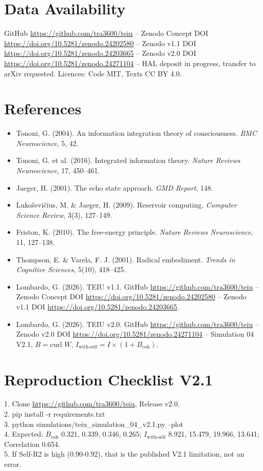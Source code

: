 \documentclass[11pt,a4paper]{article}
\begin{document}
\section*{Data Availability}
GitHub \url{https://github.com/tra3600/teiu} -- Zenodo Concept DOI \url{https://doi.org/10.5281/zenodo.24202580} -- Zenodo v1.1 DOI \url{https://doi.org/10.5281/zenodo.24203665} -- Zenodo v2.0 DOI \url{https://doi.org/10.5281/zenodo.24271104} -- HAL deposit in progress, transfer to arXiv requested. Licences: Code MIT, Texts CC BY 4.0.

\section*{References}
\begin{itemize}
\item Tononi, G. (2004). An information integration theory of consciousness. \textit{BMC Neuroscience}, 5, 42.
\item Tononi, G. et al. (2016). Integrated information theory. \textit{Nature Reviews Neuroscience}, 17, 450--461.
\item Jaeger, H. (2001). The echo state approach. \textit{GMD Report}, 148.
\item Luko\v{s}evi\v{c}ius, M. \& Jaeger, H. (2009). Reservoir computing. \textit{Computer Science Review}, 3(3), 127--149.
\item Friston, K. (2010). The free-energy principle. \textit{Nature Reviews Neuroscience}, 11, 127--138.
\item Thompson, E. \& Varela, F. J. (2001). Radical embodiment. \textit{Trends in Cognitive Sciences}, 5(10), 418--425.
\item Lombardo, G. (2026). TEIU v1.1. GitHub \url{https://github.com/tra3600/teiu} -- Zenodo Concept DOI \url{https://doi.org/10.5281/zenodo.24202580} -- Zenodo v1.1 DOI \url{https://doi.org/10.5281/zenodo.24203665}.
\item Lombardo, G. (2026). TEIU v2.0. GitHub \url{https://github.com/tra3600/teiu} -- Zenodo v2.0 DOI \url{https://doi.org/10.5281/zenodo.24271104} -- Simulation 04 V2.1, $B = \text{curl } W$, $I_{\text{with-self}} = I \times (1 + B_{\text{coh}})$.
\end{itemize}

\appendix
\section{Reproduction Checklist V2.1}
1. Clone \url{https://github.com/tra3600/teiu}, Release v2.0.\\
2. pip install -r requirements.txt\\
3. python simulations/teiu\_simulation\_04\_v2.1.py --plot\\
4. Expected: $B_{\text{coh}}$ 0.321, 0.339, 0.346, 0.265; $I_{\text{with-self}}$ 8.921, 15.479, 19.966, 13.641; Correlation 0.654.\\
5. If Self-R2 is high (0.90-0.92), that is the published V2.1 limitation, not an error.
\end{document}
